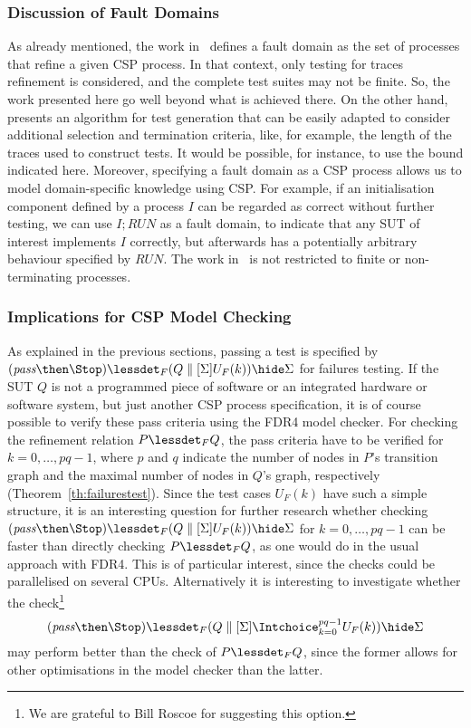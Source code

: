 \subsubsection*{Discussion of Fault Domains}
As already mentioned, the work in~\cite{DBLP:conf/pts/CavalcantiS17} defines
a fault domain as the set of processes that refine a given CSP process.  In
that context, only testing for traces refinement is considered, and the
complete test suites may not be finite. So, the work presented here go well
beyond what is achieved there. On the other hand,
\cite{DBLP:conf/pts/CavalcantiS17} presents an algorithm for test generation
that can be easily adapted to consider additional selection and termination
criteria, like, for example, the length of the traces used to construct
tests. It would be possible, for instance, to use the bound indicated here.
Moreover, specifying a fault domain as a CSP process allows us to model
domain-specific knowledge using CSP. For example, if an initialisation
component defined by a process $I$ can be regarded as correct without further
testing, we can use $I; RUN$ as a fault domain, to indicate that any SUT of
interest implements $I$ correctly, but afterwards has a potentially arbitrary
behaviour specified by $RUN$. The work in~\cite{DBLP:conf/pts/CavalcantiS17}
is not restricted to finite or non-terminating processes.

\subsubsection*{Implications for CSP Model Checking}
As explained in the previous sections, passing a test is specified by
$(\epass\then\Stop) \lessdet_F (Q\parallel[\Sigma] U_F(k)) \hide \Sigma$ for
failures testing. If the SUT $Q$ is not a programmed piece of software or an
integrated hardware or software system, but just another CSP process
specification, it is of course possible to verify these pass criteria using
the FDR4 model checker. For checking the refinement relation $P\lessdet_F Q$,
the pass criteria have to be verified for $k=0,\dots,pq-1$, where $p$ and $q$
indicate the number of nodes in $P$'s transition graph and the maximal number
of nodes in $Q$'s graph, respectively (Theorem~\ref{th:failurestest}). Since
the test cases $U_F(k)$ have such a simple structure, it is an interesting
question for further research whether checking $(\epass\then\Stop) \lessdet_F
(Q\parallel[\Sigma] U_F(k)) \hide \Sigma$ for $k=0,\dots,pq-1$ can be faster
than directly checking $P\lessdet_F Q$, as one would do in the usual approach
with FDR4. This is of particular interest, since the checks could be
parallelised on several CPUs. Alternatively it is interesting to investigate
whether the check\footnote{We are grateful to Bill Roscoe for suggesting this
option.}
\[
(\epass\then\Stop) \lessdet_F (Q\parallel[\Sigma] \Intchoice_{k=0}^{pq-1} U_F(k)) \hide \Sigma
\]
may perform better than the check of $P\lessdet_F Q$, since the former allows for
other optimisations in the model checker than the latter.

